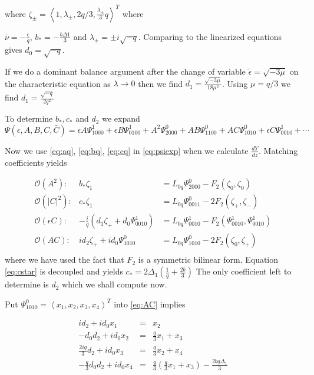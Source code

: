 where  $\zeta_\pm = \left< 1, \lambda_\pm, 2 q / 3, \frac{\lambda_\pm}{3} q\right>^T$ where 

$\bar{\nu} = -\frac{\epsilon}{q}$, $b_* = -\frac{b \Delta1}{3}$  and $\lambda_\pm = \pm i \sqrt{-q} $. Comparing to the linearized equations gives $d_0 = \sqrt{-q} $.

If we do a dominant balance argument after the change of variable $\tilde{\epsilon} = \sqrt{-3 \mu}$ on the characteristic equation as $\lambda \rightarrow 0 $ then we find $d_1 = \frac{ \sqrt{-3 \mu} }{18 \mu^2 } $. Using $\mu=q/3$ we find $d_1 = \frac{\sqrt{-q}}{2 q^2} $ 

To determine $b_*,c_*$ and $d_2$ we expand 
\begin{equation}\label{eq:psiexp}
\Psi(\epsilon,A,B,C,\bar{C}) = \epsilon A \Psi_{1000}^1 + \epsilon B \Psi_{0100}^1 + A^2 \Psi_{2000}^0 + A B \Psi_{1100}^0 + A C \Psi_{1010}^0 + \epsilon C \Psi_{0010}^1 + \cdots 
\end{equation}

Now we use \eqref{eq:aq}, \eqref{eq:bq}, \eqref{eq:cq} in  \eqref{eq:psiexp} when we calculate $\frac{dY}{dz}$. Matching coefficients yields


\begin{subequations}
\begin{eqnarray}
\mathcal{O}(A^2): &		b_* \zeta_1 &= L_{0q} \Psi_{2000}^0 - F_2(\zeta_0,\zeta_0) \\
\mathcal{O}(\left|C\right|^2):&	c_* \zeta_1 &= L_{0q} \Psi_{0011}^0 -2 F_2(\zeta_+,\zeta_-) \label{eq:cstar} \\
\mathcal{O}(\epsilon C): &-\frac{i}{q} \left(d_1 \zeta_+ +  d_0 \Psi_{0010}^1\right) &= L_{0q} \Psi_{0010}^1 - F_2(\Psi_{0010}^1,\Psi_{0010}^1) \\
\mathcal{O}(A C): 	&i d_2 \zeta_+ + i d_0 \Psi_{1010}^0 &= L_{0q} \Psi_{1010}^0 - 2 F_2(\zeta_0,\zeta_+) \\ \label{eq:AC}
\end{eqnarray}
\end{subequations}
where we have used the fact that $F_2$ is a symmetric bilinear form. Equation \eqref{eq:cstar} is decoupled and yields 
$ c_* = 2 \Delta_1 \left(\frac{1}{q} + \frac{2 b}{3} \right)$ The only coefficient left to determine is $d_2$ which we shall compute now. 

Put $\Psi_{1010}^0 = \left<x_1,x_2,x_3,x_4\right>^T$  into \eqref{eq:AC} implies 

\begin{subequations}
\begin{eqnarray}
i d_2 + i d_0 x_1 &=& x_2 \label{eq:one} \\
- d_0 d_2 + i d_0 x_2 &=& \frac{q}{3} x_1 + x_3 \label{eq:two} \\
\frac{2 i q}{3} d_2 + i d_0 x_3 &=& \frac{q}{3} x_2 + x_4  \label{eq:three} \\
- \frac{q}{3} d_0 d_2 + i d_0 x_4 &=& \frac{q}{3}\left(\frac{q}{3} x_1 + x_3 \right) - \frac{ 2 b q \Delta_1} {3} \label{eq:four}
\end{eqnarray}
\end{subequations}

